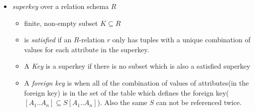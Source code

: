 \documentclass[10pt,a4paper]{article}
\begin{document}
\begin{itemize}
			\item \textit{superkey} over a relation schema $R$
			\begin{itemize}
				\item finite, non-empty subset $K \subseteq R$
				\item is \textit{satisfied} if an $R$-relation $r$ only has tuples with a unique combination of values for each attribute in the superkey.
				\item A \textit{Key} is a superkey if there is no subset which is also a satisfied superkey
				\item A \textit{foreign key} is when all of the combination of values of attributes(in the foreign key) is in the set of the table which defines the foreign key($[A_1..A_n] \subseteq S[A_1..A_n]$). Also the same $S$ can not be referenced twice.
			\end{itemize}
		\end{itemize}
\end{document}
